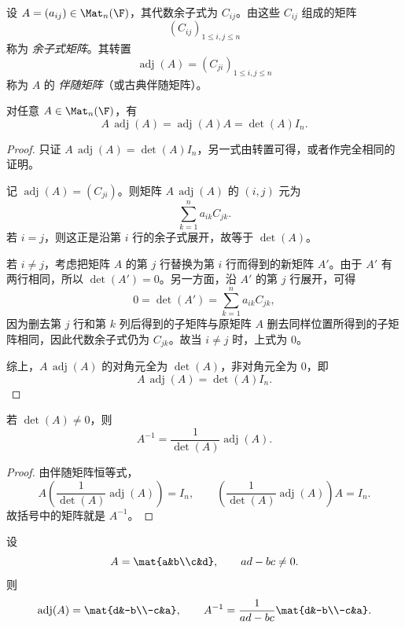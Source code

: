 \begin{definition}
设 $A=(a_{ij})\in\Mat_n(\F)$，其代数余子式为 $C_{ij}$。由这些 $C_{ij}$ 组成的矩阵
\[
(C_{ij})_{1\le i,j\le n}
\]
称为 \emph{余子式矩阵}。其转置
\[
\operatorname{adj}(A)=(C_{ji})_{1\le i,j\le n}
\]
称为 $A$ 的 \emph{伴随矩阵}（或古典伴随矩阵）。
\end{definition}

\begin{theorem}[伴随矩阵恒等式]
对任意 $A\in\Mat_n(\F)$，有
\[
A\,\operatorname{adj}(A)=\operatorname{adj}(A)A=\det(A)I_n.
\]
\end{theorem}

\begin{proof}
只证 $A\,\operatorname{adj}(A)=\det(A)I_n$，另一式由转置可得，或者作完全相同的证明。

记 $\operatorname{adj}(A)=(C_{ji})$。则矩阵 $A\,\operatorname{adj}(A)$ 的 $(i,j)$ 元为
\[
\sum_{k=1}^n a_{ik}C_{jk}.
\]
若 $i=j$，则这正是沿第 $i$ 行的余子式展开，故等于 $\det(A)$。

若 $i\ne j$，考虑把矩阵 $A$ 的第 $j$ 行替换为第 $i$ 行而得到的新矩阵 $A'$。由于 $A'$ 有两行相同，所以 $\det(A')=0$。另一方面，沿 $A'$ 的第 $j$ 行展开，可得
\[
0=\det(A')=\sum_{k=1}^n a_{ik}C_{jk},
\]
因为删去第 $j$ 行和第 $k$ 列后得到的子矩阵与原矩阵 $A$ 删去同样位置所得到的子矩阵相同，因此代数余子式仍为 $C_{jk}$。故当 $i\ne j$ 时，上式为 $0$。

综上，$A\,\operatorname{adj}(A)$ 的对角元全为 $\det(A)$，非对角元全为 $0$，即
\[
A\,\operatorname{adj}(A)=\det(A)I_n.
\]
\end{proof}

\begin{corollary}[逆矩阵公式]
若 $\det(A)\ne 0$，则
\[
A^{-1}=\frac{1}{\det(A)}\operatorname{adj}(A).
\]
\end{corollary}

\begin{proof}
由伴随矩阵恒等式，
\[
A\left(\frac{1}{\det(A)}\operatorname{adj}(A)\right)=I_n,
\qquad
\left(\frac{1}{\det(A)}\operatorname{adj}(A)\right)A=I_n.
\]
故括号中的矩阵就是 $A^{-1}$。
\end{proof}

\begin{example}
设
\[
A=\mat{a&b\\c&d},\qquad ad-bc\ne 0.
\]
则
\[
\operatorname{adj}(A)=\mat{d&-b\\-c&a},
\qquad
A^{-1}=\frac{1}{ad-bc}\mat{d&-b\\-c&a}.
\]
\end{example}

